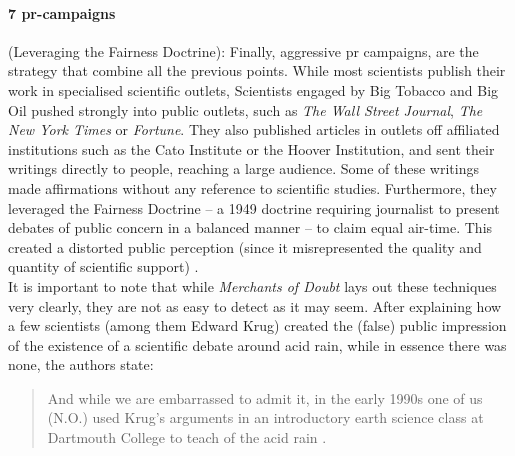 \paragraph{7 \gls{pr}-campaigns} (Leveraging the Fairness Doctrine): Finally, aggressive \gls{pr} campaigns, are the strategy that combine all the previous points.
While most scientists publish their work in specialised scientific outlets, Scientists engaged by Big Tobacco and Big Oil pushed strongly into public outlets, such as \textit{The Wall Street Journal}, \textit{The New York Times} or \textit{Fortune}. 
They also published articles in outlets off affiliated institutions such as the Cato Institute or the Hoover Institution, and sent their writings directly to people, reaching a large audience. 
Some of these writings made affirmations without any reference to scientific studies.
Furthermore, they leveraged the Fairness Doctrine -- a 1949 doctrine requiring journalist to present debates of public concern in a balanced manner -- to claim equal air-time.
This created a distorted public perception (since it misrepresented the quality and quantity of scientific support) \citep[p 18 ff]{oreskes_merchants_2010}.
\vspace{\baselineskip}\\
\noindent
It is important to note that while \textit{Merchants of Doubt} lays out these techniques very clearly, they are not as easy to detect as it may seem. 
After explaining how a few scientists (among them Edward Krug) created the (false) public impression of the existence of a scientific debate around acid rain, while in essence there was none, the authors state: 
\begin{quote}
And while we are embarrassed to admit it, in the early 1990s one of us (N.O.) used Krug's arguments in an introductory earth science class at Dartmouth College to teach  of the acid rain .
\end{quote} 
\citep[p 103]{oreskes_merchants_2010} 